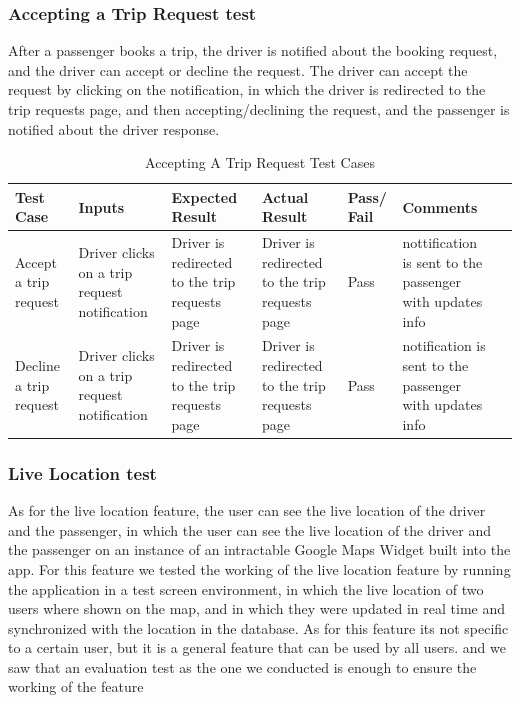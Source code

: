 \documentclass[a4paper, 12pt]{report} %
\begin{document}
            \subsubsection{Accepting a Trip Request test}
                After a passenger books a trip, the driver is notified about the booking request, and the driver can accept or decline the request. The driver can accept the request by clicking on the notification, in which the driver is redirected to the trip requests page, and then accepting/declining the request, and the passenger is notified about the driver response.

                \begin{spacing}{1}
                    \begin{table}[H]
                        \centering
                        \label{tab:accept_trip_test}
                        \begin{tabularx}{\linewidth}{| R{2cm}|R{3cm}|R{2cm}|R{2cm}|R{2cm}|R{2cm}|R{2cm}|}
                            \hline
                             \textbf{Test Case} & \textbf{Inputs} & \textbf{Expected Result} & \textbf{Actual Result} & \textbf{Pass/ Fail} & \textbf{Comments} \\
                            \hline
                            Accept a trip request & Driver clicks on a trip request notification & Driver is redirected to the trip requests page & Driver is redirected to the trip requests page & Pass & nottification is sent to the passenger with updates info\\
                            \hline
                            Decline a trip request & Driver clicks on a trip request notification & Driver is redirected to the trip requests page & Driver is redirected to the trip requests page & Pass & notification is sent to the passenger with updates info\\
                            \hline
                        \end{tabularx}
                        \caption{Accepting A Trip Request Test Cases}
                    \end{table}
                \end{spacing}

        \subsubsection{Live Location test}
            As for the live location feature, the user can see the live location of the driver and the passenger, in which the user can see the live location of the driver and the passenger on an instance of an intractable Google Maps Widget built into the app.
            For this feature we tested the working of the live location feature by running the application in a test screen environment, in which the live location of two users where shown on the map, and in which they were updated in real time and synchronized with the location in the database.
            As for this feature its not specific to a certain user, but it is a general feature that can be used by all users. and we saw that an evaluation test as the one we conducted is enough to ensure the working of the feature
\end{document}
